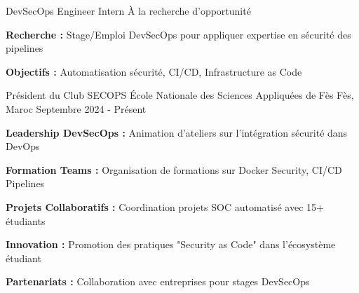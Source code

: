 
\begin{cventries}

    \cventry
    {DevSecOps Engineer Intern} %
    {À la recherche d'opportunité} %
    {} %
    {} %
    {
        \begin{cvitems} %
            \item {\textbf{Recherche :} Stage/Emploi DevSecOps pour appliquer expertise en sécurité des pipelines}
            \item {\textbf{Objectifs :} Automatisation sécurité, CI/CD, Infrastructure as Code}
        \end{cvitems}
    }

    \cventry
    {Président du Club SECOPS} %
    {École Nationale des Sciences Appliquées de Fès} %
    {Fès, Maroc} %
    {Septembre 2024 - Présent} %
    {
        \begin{cvitems} %
            \item {\textbf{Leadership DevSecOps :} Animation d'ateliers sur l'intégration sécurité dans DevOps}
            \item {\textbf{Formation Teams :} Organisation de formations sur Docker Security, CI/CD Pipelines}
            \item {\textbf{Projets Collaboratifs :} Coordination projets SOC automatisé avec 15+ étudiants}
            \item {\textbf{Innovation :} Promotion des pratiques "Security as Code" dans l'écosystème étudiant}
            \item {\textbf{Partenariats :} Collaboration avec entreprises pour stages DevSecOps}
        \end{cvitems}
    }


\end{cventries}
